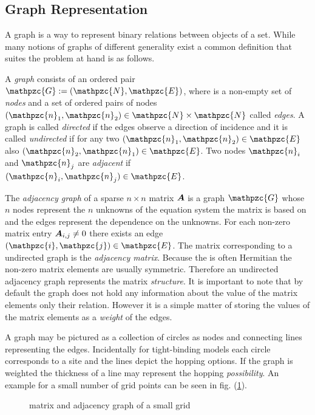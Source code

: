 \subsection{Graph Representation}
A graph is a way to represent binary relations between objects of a set. While many notions of graphs of different generality exist a common definition that suites the problem at hand is as follows.
\begin{dfn}
A \emph{graph}  consists of an ordered pair $\mathpzc{G} :=(\mathpzc{N},\mathpzc{E})$, where  is a non-empty set of \emph{nodes}  and  a set of ordered pairs of nodes $(\mathpzc{n}_1,\mathpzc{n}_2) \in \mathpzc{N} \times \mathpzc{N}$ called \emph{edges}.
A graph is called \emph{directed} if the edges observe a direction of incidence  and it is called \emph{undirected} if for any two $(\mathpzc{n}_1,\mathpzc{n}_2) \in \mathpzc{E}$ also $(\mathpzc{n}_2,\mathpzc{n}_1) \in \mathpzc{E}$.
Two nodes $\mathpzc{n}_i$ and $\mathpzc{n}_j$ are \emph{adjacent} if $(\mathpzc{n}_i,\mathpzc{n}_j) \in \mathpzc{E}$.\,\cite{graham1995handbook}
\end{dfn}
The \emph{adjacency graph} of a sparse $n \times n$ matrix $\boldsymbol{A}$ is a graph $\mathpzc{G}$ whose $n$ nodes represent the $n$ unknowns of the equation system the matrix is based on and the edges represent the dependence on the unknowns. For each non-zero matrix entry $\boldsymbol{A}_{i,j}\neq 0$ there exists an edge $(\mathpzc{i},\mathpzc{j}) \in \mathpzc{E}$. The matrix corresponding to a undirected graph is the \emph{adjacency matrix}. Because the \hamil{} is often Hermitian the non-zero matrix elements are usually symmetric. Therefore an undirected adjacency graph represents the matrix \emph{structure}. It is important to note that by default the graph does not hold any information about the value of the matrix elements only their relation. However it is a simple matter of storing the values of the matrix elements as a \emph{weight} of the edges.\par
A graph may be pictured as a collection of circles as nodes and connecting lines representing the edges. Incidentally for tight-binding models each circle corresponds to a site and the lines depict the hopping options. If the graph is weighted the thickness of a line may represent the hopping \emph{possibility}. An example for a small number of grid points can be seen in fig. (\ref{fig:matrixtograph}).
\begin{figure}[!h]
\centering
{} \quad\quad
{} \quad\quad
{}
\caption{\hamil{} matrix and adjacency graph of a small grid}
\label{fig:matrixtograph}
\end{figure}
